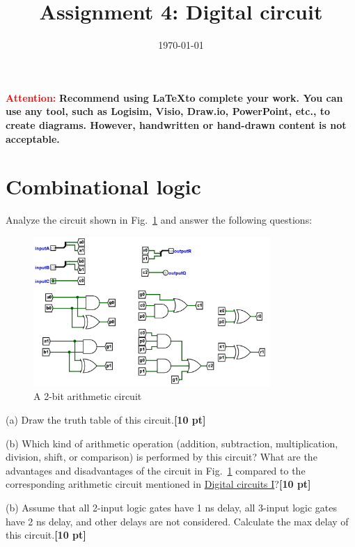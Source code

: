 \documentclass[a4paper]{article}
\date{\today}
\title{Assignment 4: Digital circuit}
\begin{document}
\header{}
\textcolor{red}{\textbf{Attention: }}
\textbf{Recommend using \LaTeX to complete your work. You can use any tool, such as Logisim, Visio, Draw.io, PowerPoint, etc., to create diagrams. However, handwritten or hand-drawn content is not acceptable.}

\section{Combinational logic}
Analyze the circuit shown in Fig.~\ref{fig:circuit} and answer the following questions:
\begin{figure}[htbp]
    \centering
    \includegraphics[width=0.8\textwidth]{circuit.png}
    \caption{A 2-bit arithmetic circuit}
    \label{fig:circuit}
\end{figure}

(a) Draw the truth table of this circuit.\textbf{[10 pt]}

(b) Which kind of arithmetic operation (addition, subtraction, multiplication, division, shift, or comparison) is performed by this circuit? What are the advantages and disadvantages of the circuit in Fig.~\ref{fig:circuit} compared to the corresponding arithmetic circuit mentioned in \href{https://toast-lab.sist.shanghaitech.edu.cn/courses/CS110@ShanghaiTech/Spring-2024/lecture_notes/L09.\%20Digital\%20circuits\%20and\%20systems\%201.pdf}{Digital circuits I}?\textbf{[10 pt]}

(b) Assume that all 2-input logic gates have 1 ns delay, all 3-input logic gates have 2 ns delay, and other delays are not considered. Calculate the max delay of this circuit.\textbf{[10 pt]}
\end{document}
